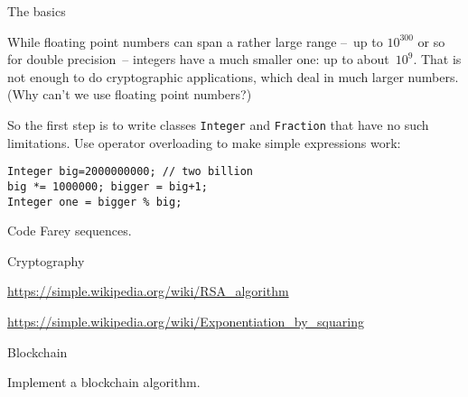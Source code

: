 
 {The basics}

While floating point numbers can span a rather large range
--~up to $10^{300}$ or so for double precision~--
integers have a much smaller one: up to about~$10^9$.
That is not enough to do cryptographic applications,
which deal in much larger numbers.
(Why can't we use floating point numbers?)

So the first step is to write classes
\lstinline{Integer} and \lstinline{Fraction}
that have no such limitations.
Use operator overloading to make simple expressions work:
\begin{lstlisting}
Integer big=2000000000; // two billion
big *= 1000000; bigger = big+1;
Integer one = bigger % big;
\end{lstlisting}

\begin{exercise}
  Code Farey sequences.

\begin{comment}
    A Farey sequence FN of degree N (or: the Farey fractions of degree N) is an ordered set of reduced
    fractions $\frac{p_i}{q_i}$
    with $p_i\leq q_i \leq N$ and
    \[ WRONG 0\leq i<|F_N|\colon p_i <p_j \forall 0\leq i<j<|FN|
    qi qj \]

    Use the class Rational from the previous exercise to write a function
    void Farey(int N)
    which calculates the Farey fractions up to degree N and prints the resulting Farey sequences up to
    degree N on the screen.

    Algorithm: The sequences can be computed recursively. The first sequence is given by
    F1 =􏰚0,1􏰛 11

    For a known sequence FN one can get FN+1 by inserting an additional fraction pi+pi+1 between two qi +qi+1
    consecutive entries pi and pi+1 if qi + qi+1 = N + 1 holds for the sum of denominators. qi qi+1
    Example: Determining F7 from F6 results in the following construction:

    F6 = 􏰚 0 , 1 , 1 , 1 , 1 , 2 , 1 , 3 , 2 , 3 , 4 , 5 , 1 􏰛 1654352534561 􏰞􏰝􏰜􏰟 􏰞􏰝􏰜􏰟 􏰞 􏰝􏰜 􏰟 􏰞􏰝􏰜􏰟 􏰞􏰝􏰜􏰟
    1 2 3and4 5 6 777777
    The new elements are:
    0+1=1 ; 1+1=2 ; 2+1=3 ; 1+3=4 ; 2+3=5 ; 5+1=6
    1+6 7 4+3 7 5+2 7 2+5 7 3+4 7 6+1 7
    The sorted sequence then is:
    F7 =􏰚0,1,1,1,1,2,1,2,3,1,4,3,2,5 3,4,5,6,1􏰛
    For checking:
    1765473572753745671
    There is a beautiful illustration of these fractions,
    The Farey sequences up to degree 6 F1 = 􏰚0,1􏰛
    11
    F2 = 􏰚0,1,1􏰛 121
    F3 = 􏰚0,1,1,2,1􏰛 13231
    F4 = 􏰚0,1,1,1,2,3,1􏰛 1432341
    F5 = 􏰚0,1,1,1,2,1,3,2,3,4,1􏰛 15435253451
    F6 = 􏰚0,1,1,1,1,2,1,3,2,3,4,5,1􏰛. 1654352534561
    the Ford circlesa:
\end{comment}

\end{exercise}

 {Cryptography}

\url{https://simple.wikipedia.org/wiki/RSA_algorithm}

\url{https://simple.wikipedia.org/wiki/Exponentiation_by_squaring}

 {Blockchain}

Implement a blockchain algorithm.
